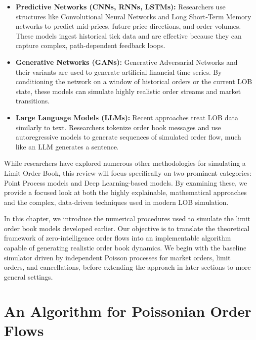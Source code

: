 \begin{itemize}
    \item \textbf{Predictive Networks (CNNs, RNNs, LSTMs):} Researchers use structures like Convolutional Neural Networks and Long Short-Term Memory networks to predict mid-prices, future price directions, and order volumes. These models ingest historical tick data and are effective because they can capture complex, path-dependent feedback loops.
    \item \textbf{Generative Networks (GANs):} Generative Adversarial Networks and their variants are used to generate artificial financial time series. By conditioning the network on a window of historical orders or the current LOB state, these models can simulate highly realistic order streams and market transitions.
    \item \textbf{Large Language Models (LLMs):} Recent approaches treat LOB data similarly to text. Researchers tokenize order book messages and use autoregressive models to generate sequences of simulated order flow, much like an LLM generates a sentence.
\end{itemize}

While researchers have explored numerous other methodologies for simulating a Limit Order Book, this review will focus specifically on two prominent categories: Point Process models and Deep Learning-based models. By examining these, we provide a focused look at both the highly explainable, mathematical approaches and the complex, data-driven techniques used in modern LOB simulation.

In this chapter, we introduce the numerical procedures used to simulate the limit order
book models developed earlier. Our objective is to translate the theoretical framework of
zero-intelligence order flows into an implementable algorithm capable of generating
realistic order book dynamics. We begin with the baseline simulator driven by independent
Poisson processes for market orders, limit orders, and cancellations, before extending the
approach in later sections to more general settings.

\section{An Algorithm for Poissonian Order Flows}


